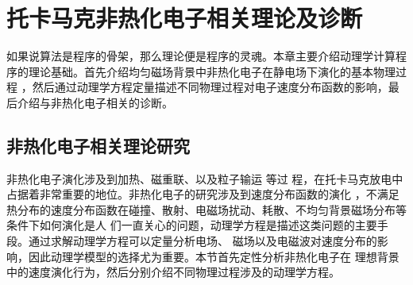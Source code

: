 \chapter{托卡马克非热化电子相关理论及诊断}\label{sec:chapt2}

\vspace{1em}
如果说算法是程序的骨架，那么理论便是程序的灵魂。本章主要介绍动理学计算程序的理论基础。首先介绍均匀磁场背景中非热化电子在静电场下演化的基本物理过程 ，然后通过动理学方程定量描述不同物理过程对电子速度分布函数的影响，最后介绍与非热化电子相关的诊断。

\section{非热化电子相关理论研究}

非热化电子演化涉及到加热\cite{RN1454}、磁重联\cite{RN1917}、以及粒子输运\cite{RN1744}	等过
程，在托卡马克放电中占据着非常重要的地位。非热化电子的研究涉及到速度分布函数的演化 ，不满足
热分布的速度分布函数在碰撞、散射、电磁场扰动、耗散、不均匀背景磁场分布等条件下如何演化是人
们一直关心的问题，动理学方程是描述这类问题的主要手段。通过求解动理学方程可以定量分析电场、
磁场以及电磁波对速度分布的影响，因此动理学模型的选择尤为重要。本节首先定性分析非热化电子在
理想背景中的速度演化行为，然后分别介绍不同物理过程涉及的动理学方程。
